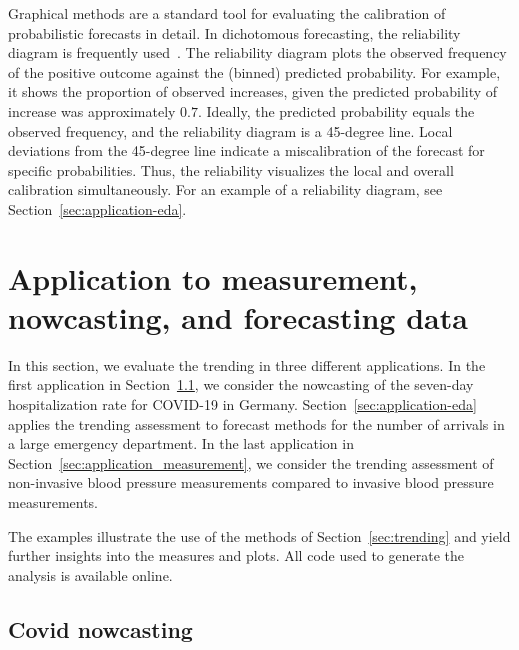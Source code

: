 \documentclass[pdflatex]{sn-jnl}
\theoremstyle{plain}%
\theoremstyle{definition}
\begin{document}
Graphical methods are a standard tool for evaluating the calibration of probabilistic forecasts in detail.
In dichotomous forecasting, the reliability diagram is frequently used~\citep{Ranjan2010}.
The reliability diagram plots the observed frequency of the positive outcome against the (binned) predicted probability.
For example, it shows the proportion of observed increases, given the predicted probability of increase was approximately $0.7$.
Ideally, the predicted probability equals the observed frequency, and the reliability diagram is a 45-degree line.
Local deviations from the 45-degree line indicate a miscalibration of the forecast for specific probabilities.
Thus, the reliability visualizes the local and overall calibration simultaneously.
For an example of a reliability diagram, see Section~\ref{sec:application-eda}.

\section{Application to measurement, nowcasting, and forecasting data} \label{sec:application}

In this section, we evaluate the trending in three different applications.
In the first application in Section~\ref{sec:application-covid}, we consider the nowcasting of the seven-day hospitalization rate for COVID-19 in Germany.
Section~\ref{sec:application-eda} applies the trending assessment to forecast methods for the number of arrivals in a large emergency department.
In the last application in Section~\ref{sec:application_measurement}, we consider the trending assessment of non-invasive blood pressure measurements compared to invasive blood pressure measurements.

The examples illustrate the use of the methods of Section~\ref{sec:trending} and yield further insights into the measures and plots.
All code used to generate the analysis is available online.


\subsection{Covid nowcasting} \label{sec:application-covid}
\end{document}

